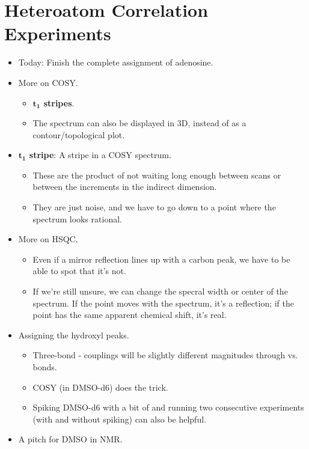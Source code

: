 \documentclass[../notes.tex]{subfiles}
\begin{document}
\section{Heteroatom Correlation Experiments}
\begin{itemize}
    \item {}Today: Finish the complete assignment of adenosine.
    \item More on COSY.
    \begin{itemize}
        \item \textbf{$\bm{t_1}$ stripes}.
        \item The spectrum can also be displayed in 3D, instead of as a contour/topological plot.
    \end{itemize}
    \item \textbf{$\bm{t_1}$ stripe}: A stripe in a COSY spectrum.
    \begin{itemize}
        \item These are the product of not waiting long enough between scans or between the increments in the indirect dimension.
        \item They are just noise, and we have to go down to a point where the spectrum looks rational.
    \end{itemize}
    \item More on HSQC.
    \begin{itemize}
        \item Even if a mirror reflection lines up with a carbon peak, we have to be able to spot that it's not.
        \item If we're still unsure, we can change the specral width or center of the spectrum. If the point moves with the spectrum, it's a reflection; if the point has the same apparent chemical shift, it's real.
    \end{itemize}
    \item Assigning the hydroxyl peaks.
    \begin{itemize}
        \item Three-bond - couplings will be slightly different magnitudes through  vs.  bonds.
        \item COSY (in DMSO-d6) does the trick.
        \item Spiking DMSO-d6 with a bit of  and running two consecutive experiments (with and without spiking) can also be helpful.
    \end{itemize}
    \item A pitch for DMSO in NMR.

\end{itemize}
\end{document}
